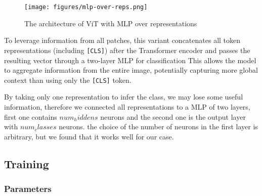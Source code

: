\documentclass[twocolumn,superscriptaddress,aps]{revtex4-1}
\begin{document}
\begin{figure}[h!]
    \centering
    \texttt{[image: figures/mlp-over-reps.png]}
    \caption{The architecture of ViT with MLP over representations}
    \label{fig:mlp-over-reps}
\end{figure}

To leverage information from all patches, this variant concatenates all token representations (including \texttt{[CLS]}) after the Transformer encoder and passes the resulting vector through a two-layer MLP for classification
 This allows the model to aggregate information from the entire image, potentially capturing more global context than using only the \texttt{[CLS]} token.

By taking only one representation to infer the class, we may lose some useful information, therefore we connected all representations to a MLP of two layers, first one contains $num_hiddens$ neurons and the second one is the output layer with $num_classes$ neurons. the choice of the number of neurons in the first layer is arbitrary, but we found that it works well for our case.



\subsection{Training}
\subsubsection{Parameters}


\end{document}
